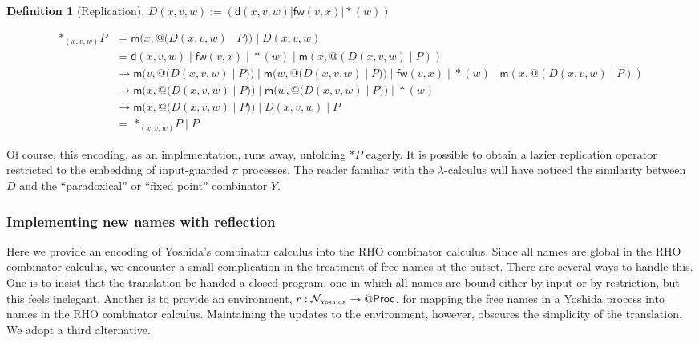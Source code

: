\documentclass[submission,copyright,creativecommons]{eptcs}
\makeatletter
\newcommand{\quotep}[1]{\mathsf{@}#1}
\newcommand{\QProc}{\quotep{\mathsf{Proc}}}
\newcommand{\red}{\rightarrow}
\theoremstyle{definition}
\newtheorem{definition}{Definition}
\theoremstyle{remark}
\theoremstyle{remark}
\makeatother
\begin{document}
\begin{definition}[Replication]
  \label{replication}
  $D(x,v,w) := (\mathsf{d}(x,v,w) | \mathsf{fw}(v,x) | {*}(w))$
\end{definition}
\[\begin{array}{rl}
  \mathsf{*}_{(x,v,w)} P &= \mathsf{m}(x,\quotep{(D(x,v,w) \; |\; P)}) \; |\; D(x,v,w) \\
        &= \mathsf{d}(x,v,w) \; |\; \mathsf{fw}(v,x) \; |\; {*}(w) \; |\; \mathsf{m}(x,\quotep{(D(x,v,w) \; |\; P)}) \\
        &\red \mathsf{m}(v,\quotep{(D(x,v,w) \; |\; P)}) \; |\; \mathsf{m}(w,\quotep{(D(x,v,w) \; |\; P)}) \; |\; \mathsf{fw}(v,x) \; |\; {*}(w) \; |\; \mathsf{m}(x,\quotep{(D(x,v,w) \; |\; P)}) \\
        &\red \mathsf{m}(x,\quotep{(D(x,v,w) \; |\; P)}) \; |\; \mathsf{m}(w,\quotep{(D(x,v,w) \; |\; P)}) \; |\; {*}(w) \\
        &\red \mathsf{m}(x,\quotep{(D(x,v,w) \; |\; P)}) \; |\; D(x,v,w) \; |\; P \\
        & = \; \mathsf{*}_{(x,v,w)} P \; |\; P
\end{array}\]

Of course, this encoding, as an implementation, runs away, unfolding
$\mathsf{*}P$ eagerly. It is possible to obtain a lazier
replication operator restricted to the embedding of
input-guarded $\pi$ processes. The reader familiar with the
$\lambda$-calculus will have noticed the similarity between $D$ and
the ``paradoxical'' or ``fixed point'' combinator $Y$.

\subsubsection{Implementing new names with reflection}

Here we provide an encoding of Yoshida's combinator calculus into the
RHO combinator calculus. Since all names are global in the RHO
combinator calculus, we encounter a small complication in the
treatment of free names at the outset. There are several ways to
handle this.  One is to insist that the translation be handed a closed
program, one in which all names are bound either by input or by
restriction, but this feels inelegant. Another is to provide
an environment, $r : \mathcal{N}_{\mbox{\tiny Yoshida}} \rightarrow \QProc$, for
mapping the free names in a Yoshida process into names in the RHO
combinator calculus. Maintaining the updates to the environment,
however, obscures the simplicity of the translation. We adopt a third
alternative.
\end{document}
